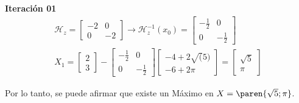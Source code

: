\begin{homeworkProblem}
\textbf{Iteración 01}\\
\begin{align*}
\mathcal{H}_z=\begin{bmatrix}
    -2 & 0 \\ 0 & -2
\end{bmatrix} 
\rightarrow
\mathcal{H}_z^{-1}(x_0)=\begin{bmatrix}
    -\frac{1}{2} & 0 \\ 0 & -\frac{1}{2}
\end{bmatrix} \\
X_1=\begin{bmatrix}
    2 \\ 3
\end{bmatrix}-\begin{bmatrix}
    -\frac{1}{2} & 0 \\ 0 & -\frac{1}{2}
\end{bmatrix}\begin{bmatrix}
     -4+2\sqrt(5) \\ -6 + 2\pi
\end{bmatrix}=\begin{bmatrix}
    \sqrt{5} \\ \pi
\end{bmatrix}
\end{align*}

Por lo tanto, se puede afirmar que existe un Máximo en $X=\paren{\sqrt{5};\pi}$.



\end{homeworkProblem}